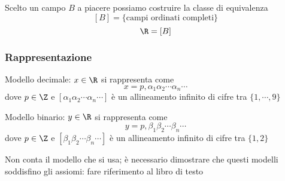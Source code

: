 
Scelto un campo $ B $ a piacere possiamo costruire la classe di equivalenza \[
    [B]=\{\text{campi ordinati completi}\}
\]
\[
    \R=[B]
\]

\subsubsection{Rappresentazione}
Modello decimale: $ x \in \R $  si rappresenta come \[
    x=p,\alpha_1\alpha_2\cdots\alpha_{n}\cdots 
\]
dove $ p \in \Z $ e $ [\alpha_1\alpha_2\cdots\alpha_{n}\cdots ] $ è un allineamento infinito di cifre tra $ \{1, \cdots, 9\} $

Modello binario: $ y \in \R $ si rappresenta come \[
    y=p,\beta_1 \beta_2\cdots\beta_{n}\cdots
\]
dove $ p \in \Z $ e $ [\beta_1 \beta_2\cdots\beta_{n}\cdots ] $ è un allineamento infinito di cifre tra $ \{1, 2\} $

Non conta il modello che si usa; è necessario dimostrare che questi modelli soddisfino gli assiomi: fare riferimento al libro di testo